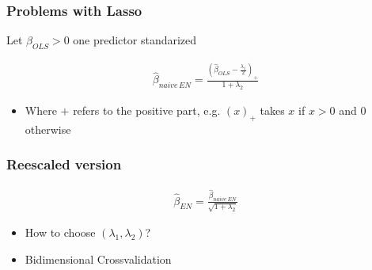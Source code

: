 \documentclass[
  shownotes,
  xcolor={svgnames},
  hyperref={colorlinks,citecolor=DarkBlue,linkcolor=DarkRed,urlcolor=DarkBlue}
  , aspectratio=169]{beamer}
\begin{document}
\begin{frame}[fragile]
\frametitle{Problems with Lasso}

Let $\beta_{OLS}>0$ one predictor standarized

\begin{align}
\hat{\beta}_{naive\,EN}= \frac{\left(\hat{\beta}_{OLS}-\frac{\lambda_1}{2}\right)_{+}}{1+\lambda_2}
\end{align}

\begin{itemize}
\item Where $+$ refers to the positive part, e.g. $(x)_{+}$ takes $x$ if $x>0$ and $0$ otherwise
\end{itemize}

\end{frame}
\begin{frame}[fragile]
\frametitle{Reescaled version}


\begin{align}
\hat{\beta}_{EN}= \frac{\hat{\beta}_{naive\,EN}}{\sqrt{1+\lambda_2}}
\end{align}

\begin{itemize}
\item How to choose $(\lambda_1,\lambda_2)$?
\item Bidimensional Crossvalidation
\end{itemize}

\end{frame}

\end{document}
